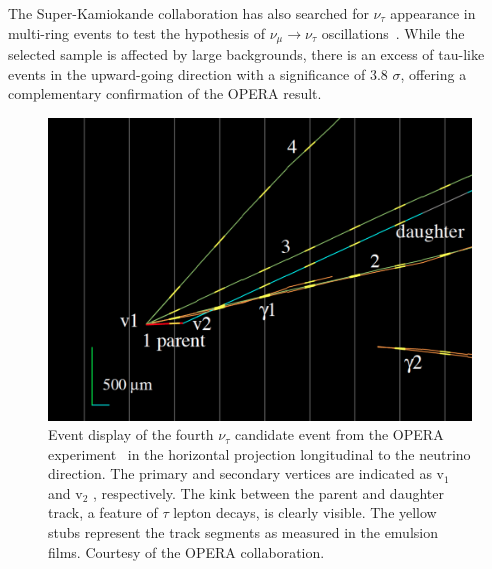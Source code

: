 The Super-Kamiokande collaboration has also searched for $\nu_\tau$ appearance in multi-ring events to test the hypothesis of $\nu_\mu \rightarrow \nu_\tau$ oscillations~\cite{Abe:2012jj}. While the selected sample is affected by large backgrounds, there is an excess of tau-like events in the upward-going direction with a significance of 3.8 $\sigma$, offering a complementary confirmation of the OPERA result.  
 
\begin{figure}[htbp]
\centering
\includegraphics[width=0.5\linewidth]{figures/tau4.pdf}
  \caption{
Event display of the fourth $\nu_\tau$ candidate event from the OPERA 
experiment~\cite{DICRESCENZO2015186} in the
horizontal projection longitudinal to the neutrino direction.
The primary and secondary vertices are indicated as v$_1$ and
v$_2$ , respectively. The kink between the parent and daughter track, a feature of $\tau$ lepton decays, is clearly visible. The yellow stubs represent the track segments as measured in the emulsion films.  Courtesy of the OPERA collaboration.
}
 \label{fig:opera}
 \end{figure}

